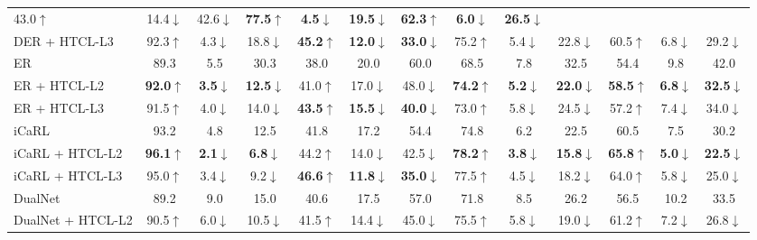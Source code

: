 \begin{table}[!htbp]
{\begin{tabular}{lcccccccccccc}
  43.0$\uparrow$ & 14.4$\downarrow$ & 42.6$\downarrow$ &
  \textbf{77.5}$\uparrow$ & \textbf{4.5}$\downarrow$ & \textbf{19.5}$\downarrow$ &
  \textbf{62.3}$\uparrow$ & \textbf{6.0}$\downarrow$ & \textbf{26.5}$\downarrow$ \\
DER + HTCL-L3 &
  92.3$\uparrow$ & 4.3$\downarrow$ & 18.8$\downarrow$ &
  \textbf{45.2}$\uparrow$ & \textbf{12.0}$\downarrow$ & \textbf{33.0}$\downarrow$ &
  75.2$\uparrow$ & 5.4$\downarrow$ & 22.8$\downarrow$ &
  60.5$\uparrow$ & 6.8$\downarrow$ & 29.2$\downarrow$ \\ \hline
ER &
  89.3 & 5.5 & 30.3 &
  38.0 & 20.0 & 60.0 &
  68.5 & 7.8 & 32.5 &
  54.4 & 9.8 & 42.0 \\
ER + HTCL-L2 &
  \textbf{92.0}$\uparrow$ & \textbf{3.5}$\downarrow$ & \textbf{12.5}$\downarrow$ &
  41.0$\uparrow$ & 17.0$\downarrow$ & 48.0$\downarrow$ &
  \textbf{74.2}$\uparrow$ & \textbf{5.2}$\downarrow$ & \textbf{22.0}$\downarrow$ &
  \textbf{58.5}$\uparrow$ & \textbf{6.8}$\downarrow$ & \textbf{32.5}$\downarrow$ \\
ER + HTCL-L3 &
  91.5$\uparrow$ & 4.0$\downarrow$ & 14.0$\downarrow$ &
  \textbf{43.5}$\uparrow$ & \textbf{15.5}$\downarrow$ & \textbf{40.0}$\downarrow$ &
  73.0$\uparrow$ & 5.8$\downarrow$ & 24.5$\downarrow$ &
  57.2$\uparrow$ & 7.4$\downarrow$ & 34.0$\downarrow$ \\ \hline
iCaRL &
  93.2 & 4.8 & 12.5 &
  41.8 & 17.2 & 54.4 &
  74.8 & 6.2 & 22.5 &
  60.5 & 7.5 & 30.2 \\
iCaRL + HTCL-L2 &
  \textbf{96.1}$\uparrow$ & \textbf{2.1}$\downarrow$ & \textbf{6.8}$\downarrow$ &
  44.2$\uparrow$ & 14.0$\downarrow$ & 42.5$\downarrow$ &
  \textbf{78.2}$\uparrow$ & \textbf{3.8}$\downarrow$ & \textbf{15.8}$\downarrow$ &
  \textbf{65.8}$\uparrow$ & \textbf{5.0}$\downarrow$ & \textbf{22.5}$\downarrow$ \\
iCaRL + HTCL-L3 &
  95.0$\uparrow$ & 3.4$\downarrow$ & 9.2$\downarrow$ &
  \textbf{46.6}$\uparrow$ & \textbf{11.8}$\downarrow$ & \textbf{35.0}$\downarrow$ &
  77.5$\uparrow$ & 4.5$\downarrow$ & 18.2$\downarrow$ &
  64.0$\uparrow$ & 5.8$\downarrow$ & 25.0$\downarrow$ \\ \hline
DualNet &
  89.2 & 9.0 & 15.0 &
  40.6 & 17.5 & 57.0 &
  71.8 & 8.5 & 26.2 &
  56.5 & 10.2 & 33.5 \\
DualNet + HTCL-L2 &
  90.5$\uparrow$ & 6.0$\downarrow$ & 10.5$\downarrow$ &
  41.5$\uparrow$ & 14.4$\downarrow$ & 45.0$\downarrow$ &
  75.5$\uparrow$ & 5.8$\downarrow$ & 19.0$\downarrow$ &
  61.2$\uparrow$ & 7.2$\downarrow$ & 26.8$\downarrow$ \\

\end{tabular}}
\end{table}
